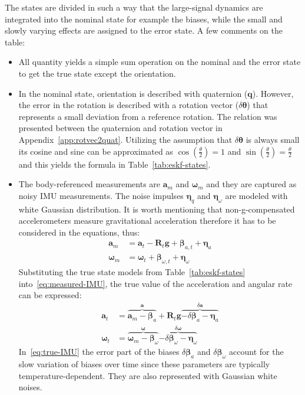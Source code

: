 The states are divided in such a way that the large-signal dynamics are integrated into the nominal state for example the biases, while the small and slowly varying effects are assigned to the error state. A few comments on the table:
\begin{itemize}
    \item 
    All quantity yields a simple sum operation on the nominal and the error state to get the true state except the orientation.
    \item
    In the nominal state, orientation is described with quaternion ($\mathbf{q}$). However, the error in the rotation is described with a rotation vector ($\delta\boldsymbol{\theta}$) that represents a small deviation from a reference rotation. The relation was presented between the quaternion and rotation vector in Appendix~\ref{app:rotvec2quat}. Utilizing the assumption that $\delta\boldsymbol{\theta}$ is always small its cosine and sine can be approximated as $\cos\left(\frac{\theta}{2}\right)=1$ and $\sin\left(\frac{\theta}{2}\right)=\frac{\theta}{2}$ and this yields the formula in Table~\ref{tab:eskf-states}.
    
    \item 
    The body-referenced measurements are $\mathbf{a}_m$ and $\boldsymbol{\omega}_m$ and they are captured as noisy IMU measurements. The noise impulses $\boldsymbol{\eta}_q$ and $\boldsymbol{\eta}_\omega$ are modeled with white Gaussian distribution. It is worth mentioning that non-g-compensated accelerometers measure gravitational acceleration therefore it has to be considered in the equations, thus:  
    \begin{equation}
    \begin{aligned}
        \mathbf{a}_m&=\mathbf{a}_t-\mathbf{R}_t\mathbf{g}+\boldsymbol{\beta}_{a,t}+\boldsymbol{\eta}_a \\
        \boldsymbol{\omega}_m&=\boldsymbol{\omega}_t+\boldsymbol{\beta}_{\omega, t}+\boldsymbol{\eta}_\omega
    \end{aligned}
    \label{eq:measured-IMU}
    \end{equation}
    Substituting the true state models from Table~\ref{tab:eskf-states} into~\eqref{eq:measured-IMU}, the true value of the acceleration and angular rate can be expressed:
    \begin{equation}
    \begin{aligned}
        \mathbf{a}_t&=\overbrace{\mathbf{a}_m-\boldsymbol{\beta}_a}^\mathbf{a}+ \mathbf{R}_{t}\mathbf{g} \overbrace{-\delta\boldsymbol{\beta}_a-\boldsymbol{\eta}_a}^{\delta\mathbf{a}} \\
        \boldsymbol{\omega}_t&=\overbrace{\boldsymbol{\omega}_m-\boldsymbol{\beta}_\omega}^{\boldsymbol{\omega}}\overbrace{-\delta\boldsymbol{\beta}_\omega-\boldsymbol{\eta}_\omega}^{\delta\boldsymbol{\omega}}
    \end{aligned}
    \label{eq:true-IMU}
    \end{equation}
    In~\eqref{eq:true-IMU} the error part of the biases $\delta\boldsymbol{\beta}_a$ and $\delta\boldsymbol{\beta}_\omega$ account for the slow variation of biases over time since these parameters are typically temperature-dependent. They are also represented with Gaussian white noises.


\end{itemize}
